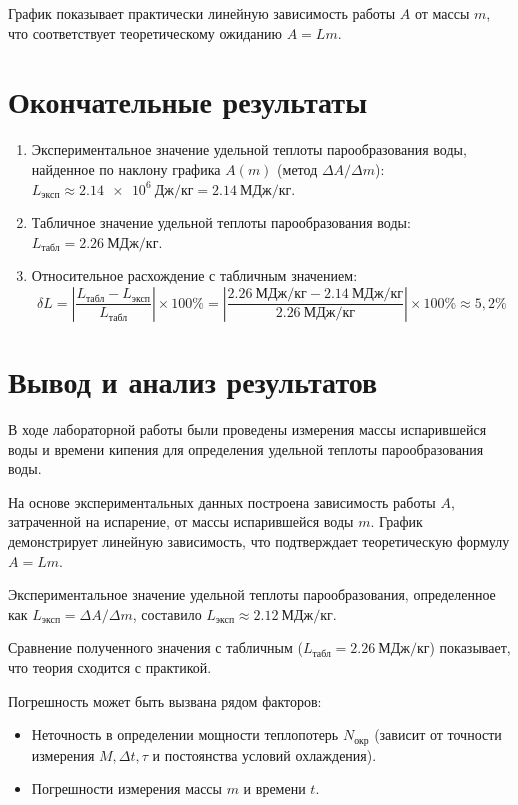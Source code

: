 \documentclass[12pt, a4paper]{article}
\begin{document}
График показывает практически линейную зависимость работы $A$ от массы $m$, что соответствует теоретическому ожиданию $A = Lm$.
\vspace{0.5cm}

\section{Окончательные результаты}
\begin{enumerate}
    \item Экспериментальное значение удельной теплоты парообразования воды, найденное по наклону графика $A(m)$ (метод $\Delta A / \Delta m$):
        $L_{\text{эксп}} \approx \SI{2,14e6}{\text{Дж/кг}} = \SI{2,14}{\text{МДж/кг}}$.
    \item Табличное значение удельной теплоты парообразования воды:
        $L_{\text{табл}} = \SI{2,26}{\text{МДж/кг}}$.
    \item Относительное расхождение с табличным значением:
        \[ \delta L = \left| \frac{L_{\text{табл}} - L_{\text{эксп}}}{L_{\text{табл}}} \right| \times 100\% = \left| \frac{\SI{2,26}{\text{МДж/кг}} - \SI{2,14}{\text{МДж/кг}}}{\SI{2,26}{\text{МДж/кг}}} \right| \times 100\% \approx 5,2 \% \]
\end{enumerate}
\vspace{0.5cm}

\section{Вывод и анализ результатов}
В ходе лабораторной работы были проведены измерения массы испарившейся воды и времени кипения для определения удельной теплоты парообразования воды.


На основе экспериментальных данных построена зависимость работы $A$, затраченной на испарение, от массы испарившейся воды $m$. График демонстрирует линейную зависимость, что подтверждает теоретическую формулу $A=Lm$.

Экспериментальное значение удельной теплоты парообразования, определенное как $L_{\text{эксп}} = \Delta A / \Delta m$, составило $L_{\text{эксп}} \approx \SI{2,12}{\text{МДж/кг}}$.

Сравнение полученного значения с табличным ($L_{\text{табл}} = \SI{2,26}{\text{МДж/кг}}$) показывает, что теория сходится с практикой.

Погрешность может быть вызвана рядом факторов:
\begin{itemize}
    \item Неточность в определении мощности теплопотерь $N_{\text{окр}}$ (зависит от точности измерения $M, \Delta t, \tau$ и постоянства условий охлаждения).
    \item Погрешности измерения массы $m$ и времени $t$.
\end{itemize}
\end{document}
